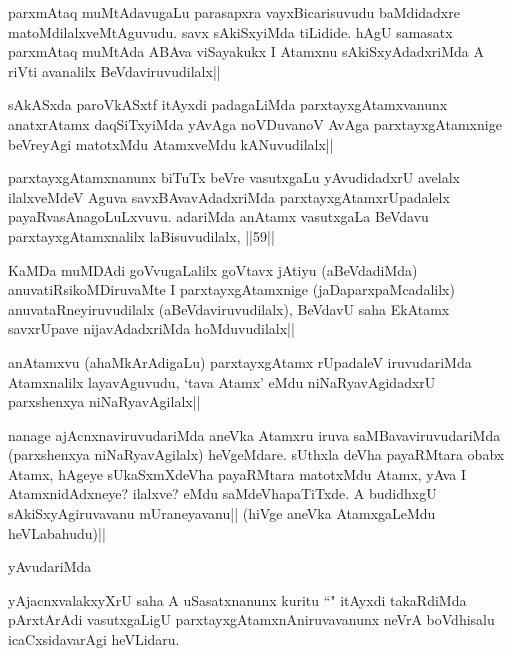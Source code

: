 \begin{artha}
parxmAtaq muMtAdavugaLu parasapxra vayxBicarisuvudu baMdidadxre matoMdilalxveMtAguvudu. savx sAkiSxyiMda tiLidide. hAgU samasatx parxmAtaq muMtAda ABAva viSayakukx I Atamxnu sAkiSxyAdadxriMda A riVti avanalilx BeVdaviruvudilalx||
\end{artha}

\begin{artha}
sAkASxda paroVkASxtf itAyxdi padagaLiMda parxtayxgAtamxvanunx anatxrAtamx daqSiTxyiMda yAvAga noVDuvanoV AvAga parxtayxgAtamxnige beVreyAgi matotxMdu AtamxveMdu kANuvudilalx||
\end{artha}

\begin{artha}%
parxtayxgAtamxnanunx biTuTx beVre vasutxgaLu yAvudidadxrU avelalx ilalxveMdeV Aguva savxBAvavAdadxriMda  parxtayxgAtamxrUpadalelx payaRvasAnagoLuLxvuvu. adariMda anAtamx vasutxgaLa BeVdavu parxtayxgAtamxnalilx laBisuvudilalx, ||59||
\end{artha}

\begin{artha}
KaMDa muMDAdi goVvugaLalilx goVtavx jAtiyu (aBeVdadiMda) anuvatiRsikoMDiruvaMte I parxtayxgAtamxnige (jaDaparxpaMcadalilx) anuvataRneyiruvudilalx (aBeVdaviruvudilalx), BeVdavU saha EkAtamx savxrUpave nijavAdadxriMda hoMduvudilalx||
\end{artha}


\begin{artha}
anAtamxvu (ahaMkArAdigaLu) parxtayxgAtamx rUpadaleV iruvudariMda Atamxnalilx layavAguvudu, `tava Atamx' eMdu niNaRyavAgidadxrU parxshenxya niNaRyavAgilalx||
\end{artha}

\begin{artha}
nanage ajAcnxnaviruvudariMda aneVka Atamxru iruva saMBavaviruvudariMda (parxshenxya niNaRyavAgilalx) heVgeMdare. sUthxla deVha  payaRMtara obabx Atamx, hAgeye sUkaSxmXdeVha payaRMtara matotxMdu Atamx, yAva I AtamxnidAdxneye? ilalxve? eMdu saMdeVhapaTiTxde. A budidhxgU sAkiSxyAgiruvavanu mUraneyavanu|| (hiVge aneVka AtamxgaLeMdu heVLabahudu)||
\end{artha}

\begin{artha}%
yAvudariMda 
\end{artha}

\begin{artha}
yAjacnxvalakxyXrU saha A uSasatxnanunx kuritu ``\stext " itAyxdi takaRdiMda pArxtArAdi vasutxgaLigU parxtayxgAtamxnAniruvavanunx neVrA boVdhisalu icaCxsidavarAgi heVLidaru.
\end{artha}

